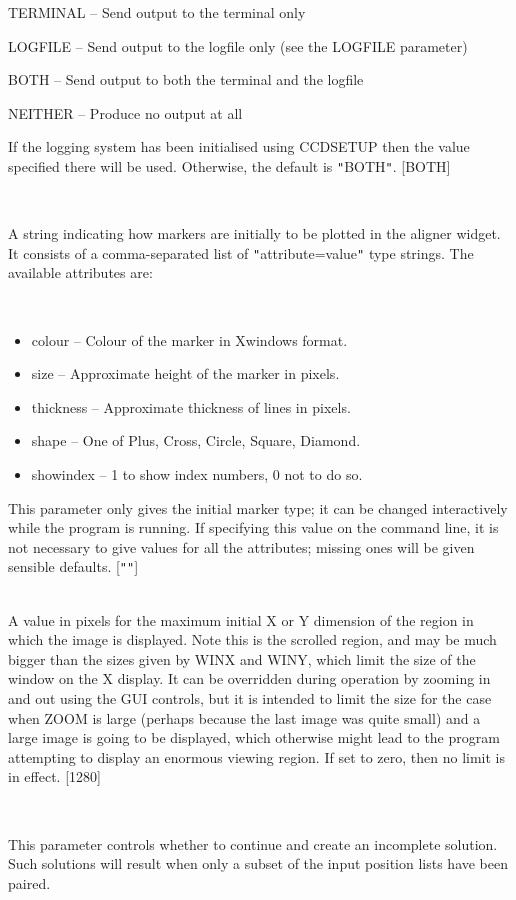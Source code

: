\documentclass[twoside,11pt]{article}
\newcommand{\htmlref}[2]{#1}
\renewcommand{\_}{\texttt{\symbol{95}}}
\newcommand{\xroutine}[1]{\htmlref{{\sc #1}}{#1}}
\newcommand{\sstsubsection}[1]{ \item[{#1}] \mbox{} \\}
\newcommand{\sstitemlist}[1]{
  \mbox{} \\
  \vspace{-3.5ex}
  \begin{itemize}
     #1
  \end{itemize}
}
\newcommand{\sstitem}{\item}
\newcommand{\sstsubsection}[1]{\item[{#1}]}
\newcommand{\sstitemlist}[1]{
      \begin{itemize}
         #1
      \end{itemize}
      \\
   }
\newcommand{\sstitem}{\item}
\begin{document}
{{{{            \sstitem
               TERMINAL  -- Send output to the terminal only

            \sstitem
               LOGFILE   -- Send output to the logfile only (see the
                               LOGFILE parameter)

            \sstitem
               BOTH      -- Send output to both the terminal and the
                               logfile

            \sstitem
               NEITHER   -- Produce no output at all

         }
         If the logging system has been initialised using \xroutine{CCDSETUP}
         then the value specified there will be used. Otherwise, the
         default is {\tt "}BOTH{\tt "}.
         [BOTH]
      }
      \sstsubsection{
         MARKSTYLE = LITERAL (Read and Write)
      }{
         A string indicating how markers are initially to be plotted in
         the aligner widget.  It consists of a comma-separated list of
         {\tt "}attribute=value{\tt "} type strings.  The available attributes are:
         \sstitemlist{

            \sstitem
               colour     -- Colour of the marker in Xwindows format.

            \sstitem
               size       -- Approximate height of the marker in pixels.

            \sstitem
               thickness  -- Approximate thickness of lines in pixels.

            \sstitem
               shape      -- One of Plus, Cross, Circle, Square, Diamond.

            \sstitem
               showindex  -- 1 to show index numbers, 0 not to do so.

         }
         This parameter only gives the initial marker type; it can be
         changed interactively while the program is running.
         If specifying this value on the command line, it is not
         necessary to give values for all the attributes; missing ones
         will be given sensible defaults.
         [{\tt "}{\tt "}]
      }
      \sstsubsection{
         MAXCANV = \_INTEGER (Read and Write)
      }{
         A value in pixels for the maximum initial X or Y dimension of
         the region in which the image is displayed.  Note this is the
         scrolled region, and may be much bigger than the sizes given
         by WINX and WINY, which limit the size of the window on the
         X display.  It can be overridden during operation by zooming
         in and out using the GUI controls, but it is intended to
         limit the size for the case when ZOOM is large (perhaps
         because the last image was quite small) and a large image
         is going to be displayed, which otherwise might lead to
         the program attempting to display an enormous viewing region.
         If set to zero, then no limit is in effect.
         [1280]
      }
      \sstsubsection{
         OVERRIDE = \_LOGICAL (Read)
      }{
         This parameter controls whether to continue and create an
         incomplete solution. Such solutions will result when only a
         subset of the input position lists have been paired.

}}}
\end{document}

